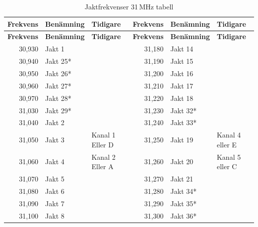 \begin{longtable}{rll|rll}
	\caption{Jaktfrekvenser 31\,MHz tabell}\\
	\textbf{Frekvens} & \textbf{Benämning} & \textbf{Tidigare} & \textbf{Frekvens} & \textbf{Benämning} & \textbf{Tidigare} \\ \hline
		\endfirsthead
	\textbf{Frekvens} & \textbf{Benämning} & \textbf{Tidigare} & \textbf{Frekvens} & \textbf{Benämning} & \textbf{Tidigare} \\ \hline
	\endhead
	           30,930 & Jakt 1             &                   &   31,180          &   Jakt 14          &                   \\
	           30,940 & Jakt 25*           &                   &   31,190          &   Jakt 15          &                   \\
	           30,950 & Jakt 26*           &                   &   31,200          &   Jakt 16          &                   \\
	           30,960 & Jakt 27*           &                   &   31,210        &     Jakt 17        &                   \\
	           30,970 & Jakt 28*           &                   &   31,220          &   Jakt 18          &                   \\
	           31,030 & Jakt 29*           &                   &   31,230        &     Jakt 32*       &                   \\
	           31,040 & Jakt 2             &                   &   31,240         &    Jakt 33*        &                   \\
	           31,050 & Jakt 3             & Kanal 1 Eller D   &   31,250          &   Jakt 19          &  Kanal 4 eller E  \\
	           31,060 & Jakt 4             & Kanal 2 Eller A   &   31,260          &   Jakt 20         &   Kanal 5 eller C \\
	           31,070 & Jakt 5             &                   &   31,270          &   Jakt 21          &                   \\
	           31,080 & Jakt 6             &                   &   31,280          &   Jakt 34*         &                   \\
	           31,090 & Jakt 7             &                   &   31,290          &   Jakt 35*         &                   \\
	           31,100 & Jakt 8             &                   &   31,300          &   Jakt 36*         &                   \\

\end{longtable}
